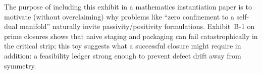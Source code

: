 The purpose of including this exhibit in a mathematics instantiation paper is to motivate (without overclaiming) why problems like ``zero confinement to a self-dual manifold'' naturally invite passivity/positivity formulations.
Exhibit~B-1 on prime closures shows that naive staging and packaging can fail catastrophically in the critical strip; this toy suggests what a successful closure might require in addition: a feasibility ledger strong enough to prevent defect drift away from symmetry.
